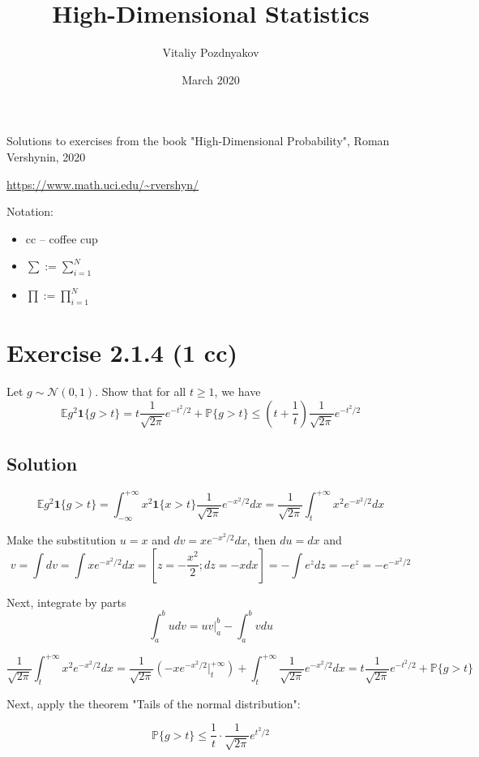 \documentclass{article}
\author{Vitaliy Pozdnyakov}
\title{High-Dimensional Statistics}
\date{March 2020}
\begin{document}
\maketitle

Solutions to exercises from the book "High-Dimensional Probability", Roman Vershynin, 2020

\url{https://www.math.uci.edu/~rvershyn/}

\bigskip

Notation:
\begin{itemize}
    \item cc -- coffee cup
    \item $\sum := \sum_{i=1}^N$
    \item $\prod := \prod_{i=1}^N$
\end{itemize}

\section{Exercise 2.1.4 (1 cc)}

Let $g \sim \mathcal N(0, 1)$. Show that for all $t \geq 1$, we have
$$\mathbb E g^2 \mathbf 1\{g>t\} = t \frac{1}{\sqrt{2 \pi}}e^{-{t^2}/{2}} + \mathbb P\{g>t\} \leq \left(t+\frac{1}{t}\right)\frac{1}{\sqrt{2 \pi}}e^{-{t^2}/{2}}$$

\subsection{Solution}
$$\mathbb E g^2 \mathbf 1\{g>t\} 
= \int_{-\infty}^{+\infty}x^2 \mathbf 1\{x>t\} \frac{1}{\sqrt{2 \pi}}e^{-{x^2}/{2}}dx 
= \frac{1}{\sqrt{2 \pi}} \int_{t}^{+\infty}x^2 e^{-{x^2}/{2}}dx$$

Make the substitution $u = x$ and $dv = xe^{-{x^2}/{2}}dx$, then $du = dx$ and $$v = \int dv = \int xe^{-{x^2}/{2}}dx = \left[z = -\frac{x^2}{2}; dz = -xdx\right] = - \int e^z dz = - e^z = - e^{-{x^2}/{2}}$$

Next, integrate by parts $$\int_a^b udv = uv\Big|_a^b - \int_a^b vdu$$

$$\frac{1}{\sqrt{2 \pi}} \int_{t}^{+\infty}x^2 e^{-{x^2}/{2}}dx 
= \frac{1}{\sqrt{2 \pi}}\left(-xe^{-{x^2}/{2}}\Big|_t^{+\infty}\right) + \int_{t}^{+\infty}\frac{1}{\sqrt{2 \pi}}e^{-{x^2}/{2}} dx 
= t \frac{1}{\sqrt{2 \pi}}e^{-{t^2}/{2}} + \mathbb P\{g>t\}$$

Next, apply the theorem "Tails of the normal distribution":

$$\mathbb P\{g>t\} \leq \frac{1}{t}\cdot \frac{1}{\sqrt{2 \pi}}e^{t^2/2}$$
\end{document}
